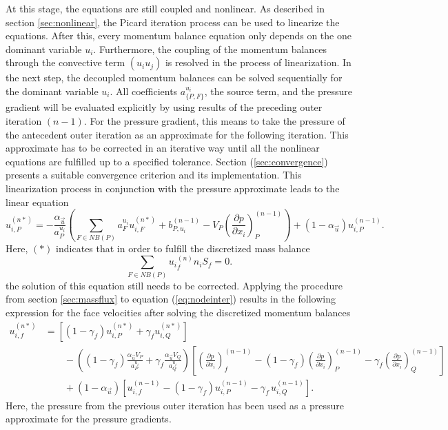 At this stage, the equations are still coupled and nonlinear. As described in section \ref{sec:nonlinear}, the Picard iteration process can be used to linearize the equations. After this, every momentum balance equation only depends on the one dominant variable \(u_i\). Furthermore, the coupling of the momentum balances through the convective term \((u_i u_j)\) is resolved in the process of linearization. In the next step, the decoupled momentum balances can be solved sequentially for the dominant variable \(u_i\). All coefficients \(a_{\{P,F\}}^{u_i}\), the source term, and the pressure gradient will be evaluated explicitly by using results of the preceding outer iteration \((n-1)\). For the pressure gradient, this means to take the pressure of the antecedent outer iteration as an approximate for the following iteration. This approximate has to be corrected in an iterative way until all the nonlinear equations are fulfilled up to a specified tolerance. Section (\ref{sec:convergence}) presents a suitable convergence criterion and its implementation. This linearization process in conjunction with the pressure approximate leads to the linear equation 
\begin{equation}
  \label{eq:nodeinter}
  u_{i,P}^{(n*)} 
  = 
  - \frac{\alpha_{\vec{u}}}{a_P^{u_i}} \left(\sum_{F \in NB(P)} a_F^{u_i} u_{i,F}^{(n*)}
  +                                     b_{P,u_i}^{(n-1)} 
  -                                     V_P\left(\frac{\partial p}{\partial x_i}\right)_P^{(n-1)} \right)
  + \left(1 - \alpha_{\vec{u}}\right) u_{i,P}^{(n-1)}.
\end{equation}
Here, \((*)\) indicates that in order to fulfill the discretized mass balance
\begin{equation}
  \label{eq:contisemi}
  \sum_{F \in NB(P)} {u_i}_f^{(n)} n_i S_f = 0.
\end{equation}
the solution of this equation still needs to be corrected. Applying the procedure from section \ref{sec:massflux} to equation (\ref{eq:nodeinter}) results in the following expression for the face velocities after solving the discretized momentum balances 
\begin{align}
  \label{eq:faceinter}
  u_{i,f}^{(n*)} 
  &=
  \left[\left(1 - \gamma_f\right) u_{i,P}^{(n*)} + \gamma_f u_{i,Q}^{(n*)} \right] \nonumber \\[1em]
  &\quad\quad - 
  \left(\left(1 - \gamma_f\right) \frac{\alpha_\vec{u} V_P}{a_P^{u_i}} + \gamma_f \frac{\alpha_\vec{u} V_Q}{a_Q^{u_i}}\right)
  \left[ 
  \left(\frac{\partial p}{\partial x_i}\right)_f^{(n-1)} 
  - \left( 1 - \gamma_f \right) \left( \frac{\partial p}{\partial x_i} \right)_P^{(n-1)} 
  - \gamma_f \left(\frac{\partial p}{\partial x_i}\right)_Q^{(n-1)}
  \right] \nonumber \\[1em]
  &\quad\quad + \left(1 - \alpha_\vec{u}\right) \left[ u_{i,f}^{(n-1)} - \left(1 - \gamma_f\right) u_{i,P}^{(n-1)} - \gamma_f \, u_{i,Q}^{(n-1)} \right].
\end{align}
Here, the pressure from the previous outer iteration has been used as a pressure approximate for the pressure gradients.

